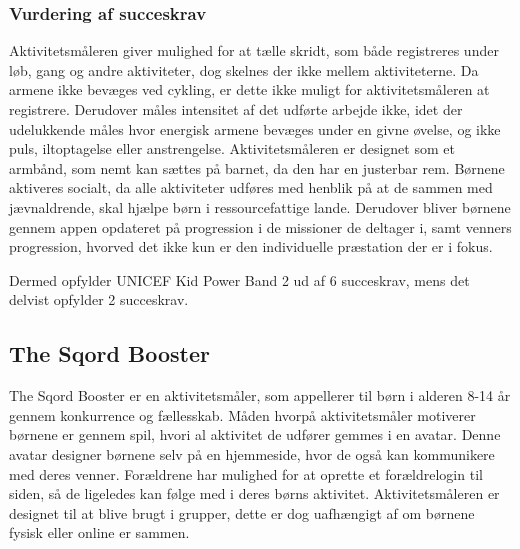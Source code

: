 
\subsubsection{Vurdering af succeskrav}
Aktivitetsmåleren giver mulighed for at tælle skridt, som både registreres under løb, gang og andre aktiviteter, dog skelnes der ikke mellem aktiviteterne. Da armene ikke bevæges ved cykling, er dette ikke muligt for aktivitetsmåleren at registrere. Derudover måles intensitet af det udførte arbejde ikke, idet der udelukkende måles hvor energisk armene bevæges under en givne øvelse, og ikke puls, iltoptagelse eller anstrengelse. Aktivitetsmåleren er designet som et armbånd, som nemt kan sættes på barnet, da den har en justerbar rem. \citep{PowerManual2015} \newline
Børnene aktiveres socialt, da alle aktiviteter udføres med henblik på at de sammen med jævnaldrende, skal hjælpe børn i ressourcefattige lande. Derudover bliver børnene gennem appen opdateret på progression i de missioner de deltager i, samt venners progression, hvorved det ikke kun er den individuelle præstation der er i fokus. %
\citep{PowerAbout2015} 

Dermed opfylder UNICEF Kid Power Band 2 ud af 6 succeskrav, mens det delvist opfylder 2 succeskrav.

\subsection{The Sqord Booster}
The Sqord Booster er en aktivitetsmåler, som appellerer til børn i alderen 8-14 år gennem konkurrence og fællesskab. Måden hvorpå aktivitetsmåler motiverer børnene er gennem spil, hvori al aktivitet de udfører gemmes i en avatar. Denne avatar designer børnene selv på en hjemmeside, hvor de også kan kommunikere med deres venner. Forældrene har mulighed for at oprette et forældrelogin til siden, så de ligeledes kan følge med i deres børns aktivitet. Aktivitetsmåleren er designet til at blive brugt i grupper, dette er dog uafhængigt af om børnene fysisk eller online er sammen. \citep{Sqord_family2015}

